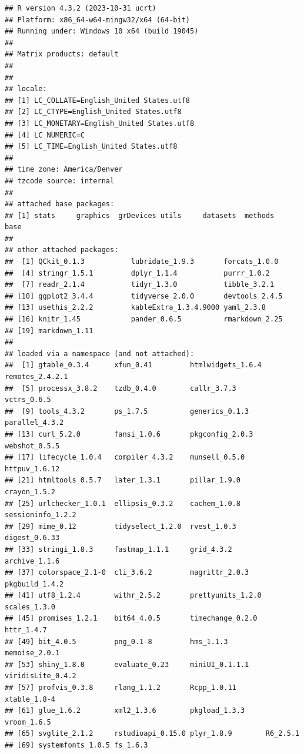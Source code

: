 \documentclass[
]{article}
\begin{document}
\begin{verbatim}
## R version 4.3.2 (2023-10-31 ucrt)
## Platform: x86_64-w64-mingw32/x64 (64-bit)
## Running under: Windows 10 x64 (build 19045)
## 
## Matrix products: default
## 
## 
## locale:
## [1] LC_COLLATE=English_United States.utf8 
## [2] LC_CTYPE=English_United States.utf8   
## [3] LC_MONETARY=English_United States.utf8
## [4] LC_NUMERIC=C                          
## [5] LC_TIME=English_United States.utf8    
## 
## time zone: America/Denver
## tzcode source: internal
## 
## attached base packages:
## [1] stats     graphics  grDevices utils     datasets  methods   base     
## 
## other attached packages:
##  [1] QCkit_0.1.3           lubridate_1.9.3       forcats_1.0.0        
##  [4] stringr_1.5.1         dplyr_1.1.4           purrr_1.0.2          
##  [7] readr_2.1.4           tidyr_1.3.0           tibble_3.2.1         
## [10] ggplot2_3.4.4         tidyverse_2.0.0       devtools_2.4.5       
## [13] usethis_2.2.2         kableExtra_1.3.4.9000 yaml_2.3.8           
## [16] knitr_1.45            pander_0.6.5          rmarkdown_2.25       
## [19] markdown_1.11        
## 
## loaded via a namespace (and not attached):
##  [1] gtable_0.3.4      xfun_0.41         htmlwidgets_1.6.4 remotes_2.4.2.1  
##  [5] processx_3.8.2    tzdb_0.4.0        callr_3.7.3       vctrs_0.6.5      
##  [9] tools_4.3.2       ps_1.7.5          generics_0.1.3    parallel_4.3.2   
## [13] curl_5.2.0        fansi_1.0.6       pkgconfig_2.0.3   webshot_0.5.5    
## [17] lifecycle_1.0.4   compiler_4.3.2    munsell_0.5.0     httpuv_1.6.12    
## [21] htmltools_0.5.7   later_1.3.1       pillar_1.9.0      crayon_1.5.2     
## [25] urlchecker_1.0.1  ellipsis_0.3.2    cachem_1.0.8      sessioninfo_1.2.2
## [29] mime_0.12         tidyselect_1.2.0  rvest_1.0.3       digest_0.6.33    
## [33] stringi_1.8.3     fastmap_1.1.1     grid_4.3.2        archive_1.1.6    
## [37] colorspace_2.1-0  cli_3.6.2         magrittr_2.0.3    pkgbuild_1.4.2   
## [41] utf8_1.2.4        withr_2.5.2       prettyunits_1.2.0 scales_1.3.0     
## [45] promises_1.2.1    bit64_4.0.5       timechange_0.2.0  httr_1.4.7       
## [49] bit_4.0.5         png_0.1-8         hms_1.1.3         memoise_2.0.1    
## [53] shiny_1.8.0       evaluate_0.23     miniUI_0.1.1.1    viridisLite_0.4.2
## [57] profvis_0.3.8     rlang_1.1.2       Rcpp_1.0.11       xtable_1.8-4     
## [61] glue_1.6.2        xml2_1.3.6        pkgload_1.3.3     vroom_1.6.5      
## [65] svglite_2.1.2     rstudioapi_0.15.0 plyr_1.8.9        R6_2.5.1         
## [69] systemfonts_1.0.5 fs_1.6.3
\end{verbatim}
\end{document}
